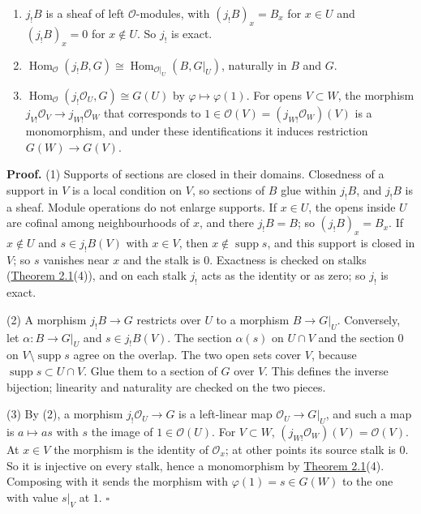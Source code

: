 \documentclass[
  english,
  11pt,
  a4paper,
]{article}
\providecommand{\tightlist}{%
  \setlength{\itemsep}{0pt}\setlength{\parskip}{0pt}}
\begin{document}
\begin{enumerate}
\tightlist
\item
  \(j_!B\) is a sheaf of left \(\mathcal O\)-modules, with
  \((j_!B)_x=B_x\) for \(x\in U\) and \((j_!B)_x=0\) for \(x\notin U\).
  So \(j_!\) is exact.
\item
  \(\operatorname{Hom}_{\mathcal O}(j_!B,G)\cong\operatorname{Hom}_{\mathcal O|_U}(B,G|_U)\),
  naturally in \(B\) and \(G\).
\item
  \(\operatorname{Hom}_{\mathcal O}(j_!\mathcal O_U,G)\cong G(U)\) by
  \(\varphi\mapsto\varphi(1)\). For opens \(V\subset W\), the morphism
  \(j_{V!}\mathcal O_V\to j_{W!}\mathcal O_W\) that corresponds to
  \(1\in\mathcal O(V)=(j_{W!}\mathcal O_W)(V)\) is a monomorphism, and
  under these identifications it induces restriction \(G(W)\to G(V)\).
\end{enumerate}

\textbf{Proof.} (1) Supports of sections are closed in their domains.
Closedness of a support in \(V\) is a local condition on \(V\), so
sections of \(B\) glue within \(j_!B\), and \(j_!B\) is a sheaf. Module
operations do not enlarge supports. If \(x\in U\), the opens inside
\(U\) are cofinal among neighbourhoods of \(x\), and there \(j_!B=B\);
so \((j_!B)_x=B_x\). If \(x\notin U\) and \(s\in j_!B(V)\) with
\(x\in V\), then \(x\notin\operatorname{supp}s\), and this support is
closed in \(V\); so \(s\) vanishes near \(x\) and the stalk is \(0\).
Exactness is checked on stalks
(\hyperref[sheaves-of-modules-on-a-ringed-space--2-the-abelian-category-of-module-sheaves]{Theorem
2.1}(4)), and on each stalk \(j_!\) acts as the identity or as zero; so
\(j_!\) is exact.

(2) A morphism \(j_!B\to G\) restricts over \(U\) to a morphism
\(B\to G|_U\). Conversely, let \(\alpha:B\to G|_U\) and
\(s\in j_!B(V)\). The section \(\alpha(s)\) on \(U\cap V\) and the
section \(0\) on \(V\setminus\operatorname{supp}s\) agree on the
overlap. The two open sets cover \(V\), because
\(\operatorname{supp}s\subset U\cap V\). Glue them to a section of \(G\)
over \(V\). This defines the inverse bijection; linearity and naturality
are checked on the two pieces.

(3) By (2), a morphism \(j_!\mathcal O_U\to G\) is a left-linear map
\(\mathcal O_U\to G|_U\), and such a map is \(a\mapsto as\) with \(s\)
the image of \(1\in\mathcal O(U)\). For \(V\subset W\),
\((j_{W!}\mathcal O_W)(V)=\mathcal O(V)\). At \(x\in V\) the morphism is
the identity of \(\mathcal O_x\); at other points its source stalk is
\(0\). So it is injective on every stalk, hence a monomorphism by
\hyperref[sheaves-of-modules-on-a-ringed-space--2-the-abelian-category-of-module-sheaves]{Theorem
2.1}(4). Composing with it sends the morphism with
\(\varphi(1)=s\in G(W)\) to the one with value \(s|_V\) at \(1\).
\(\square\)
\end{document}
